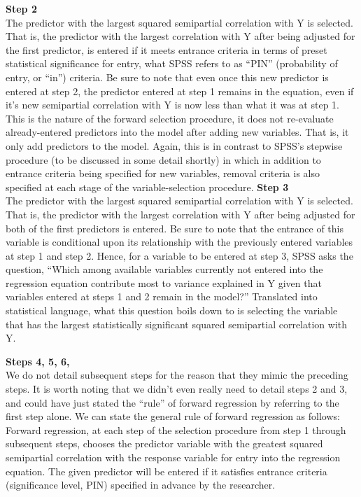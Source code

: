 \documentclass[a4paper,12pt]{article}
\begin{document}
\textbf{Step 2}\\
The predictor with the largest squared semipartial correlation with Y is selected. That is, the predictor with the largest correlation with Y after being adjusted for the first predictor, is entered if it meets entrance criteria in terms of preset statistical significance for entry, what SPSS refers to as “PIN” (probability of entry, or “in”) criteria. Be sure to note that even once this new predictor is entered at step 2, the predictor entered at step 1 remains in the equation, even if it’s new semipartial correlation with Y is now less than what it was at step 1. This is the nature of the forward selection procedure, it does not re-evaluate already-entered predictors into the model after adding new variables. That is, it only add predictors to the model. Again, this is in contrast to SPSS’s stepwise procedure (to be discussed in some detail shortly) in which in addition to entrance criteria being specified for new variables, removal criteria is also specified at each stage of the variable-selection procedure.
\textbf{Step 3}\\
The predictor with the largest squared semipartial correlation with Y is selected. That is, the predictor with the largest correlation with Y after being adjusted for both of the first predictors is entered. Be sure to note that the entrance of this variable is conditional upon its relationship with the previously entered variables at step 1 and step 2. Hence, for a variable to be entered at step 3, SPSS asks the question, “Which among available variables currently not entered into the regression equation contribute most to variance explained in Y given that variables entered at steps 1 and 2 remain in the model?” Translated into statistical language, what this question boils down to is selecting the variable that has the largest statistically significant squared semipartial correlation with Y.

\textbf{Steps 4, 5, 6, } \\
We do not detail subsequent steps for the reason that they mimic the preceding steps. It is worth noting that we didn’t even really need to detail steps 2 and 3, and could have just stated the “rule” of forward regression by referring to the first step alone. We can state the general rule of forward regression as follows:
Forward regression, at each step of the selection procedure from step 1 through subsequent steps, chooses the predictor variable with the greatest squared semipartial correlation with the response variable for entry into the regression equation. The given predictor will be entered if it satisfies entrance criteria (significance level, PIN) specified in advance by the researcher.
\end{document}
